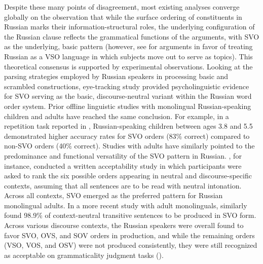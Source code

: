 \documentclass[output=paper]{langscibook}
\begin{document}
Despite these many points of disagreement, most existing analyses converge globally on the observation that while the surface ordering of constituents in Russian marks their information-structural roles, the underlying configuration of the Russian clause reflects the grammatical functions of the arguments, with SVO as the underlying, basic pattern (however, see \citealt{King1995} for arguments in favor of treating Russian as a VSO language in which subjects move out to serve as topics). This theoretical consensus is supported by experimental observations. Looking at the parsing strategies employed by Russian speakers in processing basic and scrambled constructions,  eye-tracking study provided psycholinguistic evidence for SVO serving as the basic, discourse-neutral variant within the Russian word order system. Prior offline linguistic studies with monolingual Russian-speaking children and adults have reached the same conclusion. For example, in a repetition task reported in \citet{Bailyn1995}, Russian-speaking children between ages 3.8 and 5.5 demonstrated higher accuracy rates for SVO orders (83\% correct) compared to non-SVO orders (40\% correct). Studies with adults have similarly pointed to the predominance and functional versatility of the SVO pattern in Russian. \citet{HoldenKrupp1987}, for instance, conducted a written acceptability study in which participants were asked to rank the six possible orders appearing in neutral and discourse-specific contexts, assuming that all sentences are to be read with neutral intonation. Across all contexts, SVO emerged as the preferred pattern for Russian monolingual adults. In a more recent study with adult monolinguals, \citet{Kallestinova2007} similarly found 98.9\% of context-neutral transitive sentences to be produced in SVO form. Across various discourse contexts, the Russian speakers were overall found to favor SVO, OVS, and SOV orders in production, and while the remaining orders (VSO, VOS, and OSV) were not produced consistently, they were still recognized as acceptable on grammaticality judgment tasks (\citealt{Kallestinova2007}).
\end{document}
